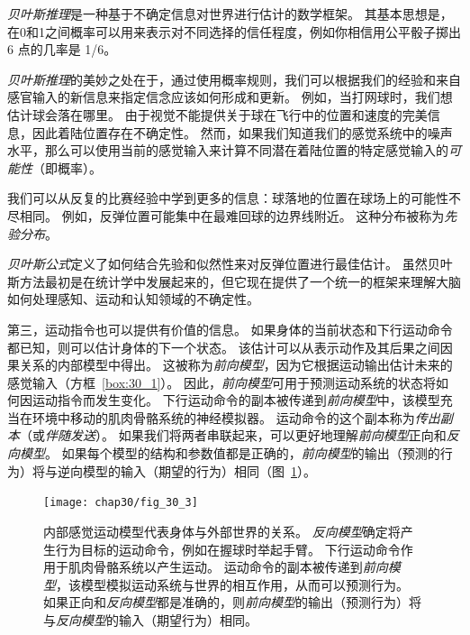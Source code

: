 \begin{proposition}[贝叶斯推理] \label{box:30_2}
	
	\quad \quad \textit{贝叶斯推理}是一种基于不确定信息对世界进行估计的数学框架。
	其基本思想是，在0和1之间概率可以用来表示对不同选择的信任程度，例如你相信用公平骰子掷出 6 点的几率是 1/6。
	
	\quad \quad \textit{贝叶斯推理}的美妙之处在于，通过使用概率规则，我们可以根据我们的经验和来自感官输入的新信息来指定信念应该如何形成和更新。
	例如，当打网球时，我们想估计球会落在哪里。
	由于视觉不能提供关于球在飞行中的位置和速度的完美信息，因此着陆位置存在不确定性。
	然而，如果我们知道我们的感觉系统中的噪声水平，那么可以使用当前的感觉输入来计算不同潜在着陆位置的特定感觉输入的\textit{可能性}（即概率）。
	
	\quad \quad 我们可以从反复的比赛经验中学到更多的信息：球落地的位置在球场上的可能性不尽相同。
	例如，反弹位置可能集中在最难回球的边界线附近。
	这种分布被称为\textit{先验分布}。
	
	\quad \quad \textit{贝叶斯公式}定义了如何结合先验和似然性来对反弹位置进行最佳估计。
	虽然贝叶斯方法最初是在统计学中发展起来的，但它现在提供了一个统一的框架来理解大脑如何处理感知、运动和认知领域的不确定性。
	
\end{proposition}


第三，运动指令也可以提供有价值的信息。
如果身体的当前状态和下行运动命令都已知，则可以估计身体的下一个状态。
该估计可以从表示动作及其后果之间因果关系的内部模型中得出。
这被称为\textit{前向模型}，因为它根据运动输出估计未来的感觉输入（方框~\ref{box:30_1}）。
因此，\textit{前向模型}可用于预测运动系统的状态将如何因运动指令而发生变化。
下行运动命令的副本被传递到\textit{前向模型}中，该模型充当在环境中移动的肌肉骨骼系统的神经模拟器。
运动命令的这个副本称为\textit{传出副本}（或\textit{伴随发送}）。
如果我们将两者串联起来，可以更好地理解\textit{前向模型}正向和\textit{反向模型}。
如果每个模型的结构和参数值都是正确的，\textit{前向模型}的输出（预测的行为）将与逆向模型的输入（期望的行为）相同（图~\ref{fig:30_3}）。


\begin{figure}[htbp]
	\centering
	\texttt{[image: chap30/fig\_30\_3]}
	\caption{内部感觉运动模型代表身体与外部世界的关系。
		\textit{反向模型}确定将产生行为目标的运动命令，例如在握球时举起手臂。
		下行运动命令作用于肌肉骨骼系统以产生运动。
		运动命令的副本被传递到\textit{前向模型}，该模型模拟运动系统与世界的相互作用，从而可以预测行为。
		如果正向和\textit{反向模型}都是准确的，则\textit{前向模型}的输出（预测行为）将与\textit{反向模型}的输入（期望行为）相同。}
	\label{fig:30_3}
\end{figure}


